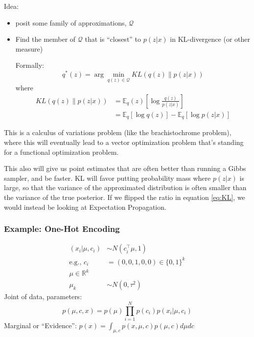 \documentclass{article}
\begin{document}
Idea:
\begin{itemize}
  \item posit some family of approximations, $\mathcal{Q}$
  \item Find the member of $\mathcal{Q}$ that is ``closest'' to $p(z|x)$ in KL-divergence (or other measure)

  \hspace{5ex} Formally:
  \begin{equation}
    q^*(z)=\arg\min_{q(z)\in\mathcal{Q}}KL \left(q(z) \middle\| p(z|x)\right)
  \end{equation}
  where
  \begin{align*}
    \label{eq:KL}
    KL \left(q(z) \middle\| p(z|x)\right) &= \mathbb{E}_q(z)\left[\log\frac{q(z)}{p(z|x)}\right]
    \\
    &= \mathbb{E}_q\left[\log q(z)\right] - \mathbb{E}_q\left[\log p(z|x)\right]
  \end{align*}
\end{itemize}

This is a calculus of variations problem (like the brachistochrome problem), where this will eventually
lead to a vector optimization problem that's standing for a functional optimization problem.

This also will give us point estimates that are often better than running a Gibbs sampler, and be faster.
KL will favor putting probability mass where $p(z|x)$ is large, so that the variance of the approximated
distribution is often smaller than the variance of the true posterior. If we flipped the ratio in equation
\ref{eq:KL}, we would instead be looking at Expectation Propagation.

\subsubsection{Example: One-Hot Encoding}
\begin{align*}
  (x_i|\mu, c_i) &\sim N(c_i^\top \mu, 1)
  \\
  \textrm{e.g.,~}c_i &= (0, 0, 1, 0, 0) \in \{0,1\}^k
  \\
  \mu\in\mathbb{R}^k
  \\
  \mu_k&\sim N(0,\tau^2)
\end{align*}
Joint of data, parameters:
\begin{equation*}
  p(\mu,c,x)=p(\mu)\prod_{i=1}^N p(c_i)p(x_i|\mu,c_i)
\end{equation*}
Marginal or ``Evidence'': $p(x)=\int_{\mu,c}p(x,\mu,c)p(\mu,c)d\mu dc$
\end{document}
